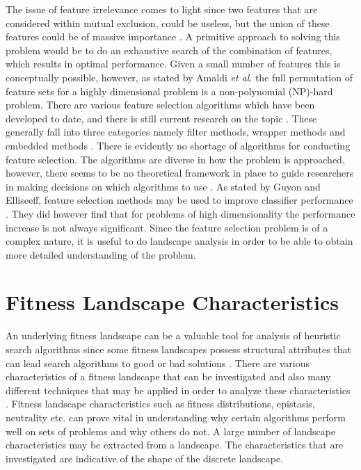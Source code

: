 \documentclass[journal,comsoc]{IEEEtran}
\begin{document}
The issue of feature irrelevance comes to light since two features that are considered within mutual exclusion, could be useless, but the union of these features could be of massive importance \cite{guyon2003introduction}. A primitive approach to solving this problem would be to do an exhaustive search of the combination of features, which results in optimal performance. Given a small number of features this is conceptually possible, however,  as stated by Amaldi  \textit{et al}. \cite{amaldi1998approximability} the full permutation of feature sets for a highly dimensional problem is a non-polynomial (NP)-hard problem.
There are various feature selection algorithms which have been developed to date, and there is still current research on the topic \cite{kira1992feature, jain1997feature, kohavi1997wrappers, yu2003feature, yeh2016feature, ge2016mctwo}. These generally fall into three categories namely filter methods, wrapper methods and embedded methods \cite{chandrashekar2014survey}. There is evidently no shortage of algorithms for conducting feature selection. The algorithms are diverse in how the problem is approached, however, there seems to be no theoretical framework in place to guide researchers in making decisions on which algorithms to use \cite{guyon2003introduction}. As stated by Guyon and Elliseeff, feature selection methods may be used to improve classifier performance \cite{guyon2003introduction}. They did however find that for problems of high dimensionality the performance increase is not always significant. Since the feature selection problem is of a complex nature, it is useful to do landscape analysis in order to be able to obtain more detailed understanding of the problem.




\section{Fitness Landscape Characteristics}

An underlying fitness landscape can be a valuable tool for analysis of heuristic search algorithms \cite{pitzer2012comprehensive} since some fitness landscapes possess structural attributes that can lead search algorithms to good or bad solutions \cite{malan2013survey}. There are various characteristics of a fitness landscape that can be investigated and also many different techniques that may be applied in order to analyze these characteristics \cite{malan2013survey}. Fitness landscape characteristics such as fitness distributions, epistasis, neutrality etc. can prove vital in understanding why certain algorithms perform well on sets of problems and why others do not.
A large number of landscape characteristics may be extracted from a landscape. The characteristics that are investigated are indicative of the shape of the discrete landscape.
\end{document}
